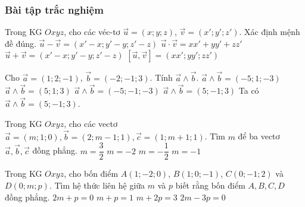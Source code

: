 \subsubsection{Bài tập trắc nghiệm}
\begin{ex}%
	Trong KG $Oxyz$, cho các véc-tơ $\overrightarrow{u}=(x;y;z)$, $\overrightarrow{v}=(x';y';z')$. Xác định mệnh đề đúng.
	\choice
	{$\overrightarrow{u}-\overrightarrow{v}=(x'-x;y'-y;z'-z)$}
	{\True $\overrightarrow{u}\cdot\overrightarrow{v}=xx'+yy'+zz'$}
	{$\overrightarrow{u}+\overrightarrow{v}=(x'-x;y'-y;z'-z)$}
	{$\left[\overrightarrow{u},\overrightarrow{v}\right]=(xx';yy';zz')$}
\end{ex}
\begin{ex}%
	Cho $\vec{a}=(1;2;-1)$, $\vec{b}=(-2;-1;3)$. Tính $\vec{a}\wedge\vec{b}$.
	\choice
	{$\vec{a}\wedge\vec{b}=(-5;1;-3)$}
	{$\vec{a}\wedge\vec{b}=(5;1;3)$}
	{$\vec{a}\wedge\vec{b}=(-5;-1;-3)$}
	{\True $\vec{a}\wedge\vec{b}=(5;-1;3)$}
	\loigiai
	{
		Ta có $\vec{a}\wedge\vec{b}=(5;-1;3)$.
	}
\end{ex}
\begin{ex}%
	Trong KG $Oxyz$, cho các vectơ $\overrightarrow a=(m;1;0),\overrightarrow b=(2;m-1;1),\overrightarrow{c}=(1;m+1;1)$. Tìm $m$ để ba vectơ $\overrightarrow a ,\overrightarrow b ,\overrightarrow c$ đồng phẳng.
	\choice
	{$m=\dfrac{3}{2}$}
	{$m=-2$}
	{\True $m=-\dfrac{1}{2}$}
	{$m=-1$}
\end{ex}
\begin{ex}%
	Trong KG $Oxyz$, cho bốn điểm $A(1;-2;0)$, $B(1;0;-1)$, $C(0;-1;2)$ và $D(0;m;p)$. Tìm hệ thức liên hệ giữa $m$ và $p$ biết rằng bốn điểm $A,B,C,D$ đồng phẳng.
	\choice
	{$2m+p=0$}
	{$m+p=1$}
	{\True $m+2p=3$}
	{$2m-3p=0$} 
\end{ex}

